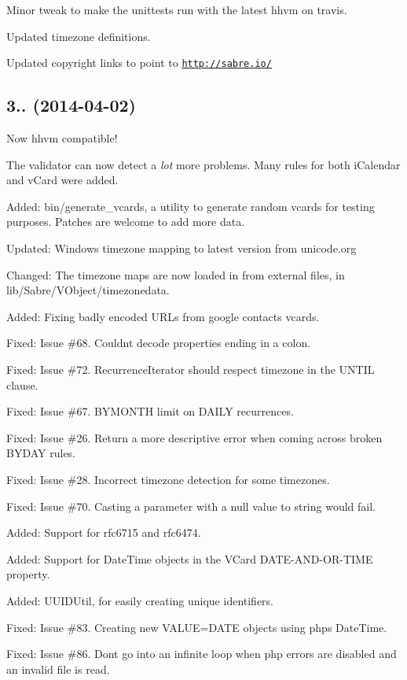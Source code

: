 \begin{DoxyItemize}
\item Minor tweak to make the unittests run with the latest hhvm on travis.
\item Updated timezone definitions.
\item Updated copyright links to point to \href{http://sabre.io/}{\tt http\+://sabre.\+io/}
\end{DoxyItemize}

\subsection*{3.. (2014-\/04-\/02) }


\begin{DoxyItemize}
\item Now hhvm compatible!
\item The validator can now detect a {\itshape lot} more problems. Many rules for both i\+Calendar and v\+Card were added.
\item Added\+: bin/generate\+\_\+vcards, a utility to generate random vcards for testing purposes. Patches are welcome to add more data.
\item Updated\+: Windows timezone mapping to latest version from unicode.\+org
\item Changed\+: The timezone maps are now loaded in from external files, in lib/\+Sabre/\+V\+Object/timezonedata.
\item Added\+: Fixing badly encoded U\+RL\textquotesingle{}s from google contacts vcards.
\item Fixed\+: Issue \#68. Couldn\textquotesingle{}t decode properties ending in a colon.
\item Fixed\+: Issue \#72. Recurrence\+Iterator should respect timezone in the U\+N\+T\+IL clause.
\item Fixed\+: Issue \#67. B\+Y\+M\+O\+N\+TH limit on D\+A\+I\+LY recurrences.
\item Fixed\+: Issue \#26. Return a more descriptive error when coming across broken B\+Y\+D\+AY rules.
\item Fixed\+: Issue \#28. Incorrect timezone detection for some timezones.
\item Fixed\+: Issue \#70. Casting a parameter with a null value to string would fail.
\item Added\+: Support for rfc6715 and rfc6474.
\item Added\+: Support for Date\+Time objects in the V\+Card D\+A\+T\+E-\/\+A\+N\+D-\/\+O\+R-\/\+T\+I\+ME property.
\item Added\+: U\+U\+I\+D\+Util, for easily creating unique identifiers.
\item Fixed\+: Issue \#83. Creating new V\+A\+L\+UE=D\+A\+TE objects using php\textquotesingle{}s Date\+Time.
\item Fixed\+: Issue \#86. Don\textquotesingle{}t go into an infinite loop when php errors are disabled and an invalid file is read.
\end{DoxyItemize}

